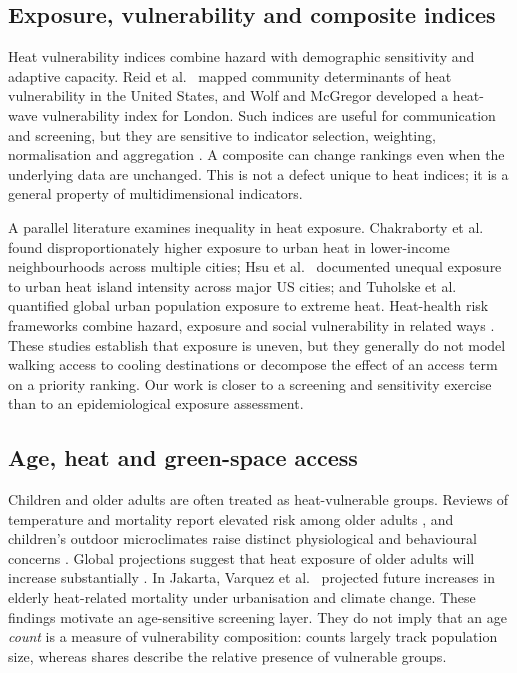 \documentclass[times,twoside]{_Templates/MultiTargetManuscript}
\begin{document}
\subsection{Exposure, vulnerability and composite indices}

Heat vulnerability indices combine hazard with demographic sensitivity and
adaptive capacity. Reid et al.\ \citep{reid2009} mapped community determinants of
heat vulnerability in the United States, and Wolf and McGregor
\citep{wolf2013} developed a heat-wave vulnerability index for London. Such
indices are useful for communication and screening, but they are sensitive to
indicator selection, weighting, normalisation and aggregation
\citep{saisana2005,paruolo2013,greco2019}. A composite can change rankings even
when the underlying data are unchanged. This is not a defect unique to heat
indices; it is a general property of multidimensional indicators.

A parallel literature examines inequality in heat exposure. Chakraborty et al.\
\citep{chakraborty2019} found disproportionately higher exposure to urban heat
in lower-income neighbourhoods across multiple cities; Hsu et al.\
\citep{hsu2021} documented unequal exposure to urban heat island intensity across
major US cities; and Tuholske et al.\ \citep{tuholske2021} quantified global
urban population exposure to extreme heat. Heat-health risk frameworks combine
hazard, exposure and social vulnerability in related ways \citep{dong2020}.
These studies establish that exposure is uneven, but they generally do not model
walking access to cooling destinations or decompose the effect of an access term
on a priority ranking. Our work is closer to a screening and sensitivity
exercise than to an epidemiological exposure assessment.

\subsection{Age, heat and green-space access}

Children and older adults are often treated as heat-vulnerable groups. Reviews
of temperature and mortality report elevated risk among older adults
\citep{basu2009,astrom2011}, and children's outdoor microclimates raise distinct
physiological and behavioural concerns \citep{vanos2015}. Global projections
suggest that heat exposure of older adults will increase substantially
\citep{falchetta2024}. In Jakarta, Varquez et al.\ \citep{varquez2020} projected
future increases in elderly heat-related mortality under urbanisation and
climate change. These findings motivate an age-sensitive screening layer. They
do not imply that an age \emph{count} is a measure of vulnerability composition:
counts largely track population size, whereas shares describe the relative
presence of vulnerable groups.
\end{document}
